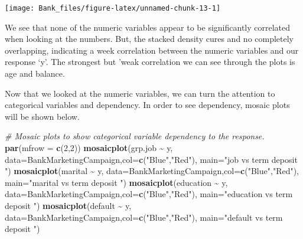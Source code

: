 \documentclass[
]{article}
\newenvironment{Shaded}{\begin{snugshade}}{\end{snugshade}}
\newcommand{\AttributeTok}[1]{\textcolor[rgb]{0.13,0.29,0.53}{#1}}
\newcommand{\CommentTok}[1]{\textcolor[rgb]{0.56,0.35,0.01}{\textit{#1}}}
\newcommand{\DecValTok}[1]{\textcolor[rgb]{0.00,0.00,0.81}{#1}}
\newcommand{\FunctionTok}[1]{\textcolor[rgb]{0.13,0.29,0.53}{\textbf{#1}}}
\newcommand{\NormalTok}[1]{#1}
\newcommand{\SpecialCharTok}[1]{\textcolor[rgb]{0.81,0.36,0.00}{\textbf{#1}}}
\newcommand{\StringTok}[1]{\textcolor[rgb]{0.31,0.60,0.02}{#1}}
\begin{document}
\begin{center}\texttt{[image: Bank\_files/figure-latex/unnamed-chunk-13-1]} \end{center}

We see that none of the numeric variables appear to be significantly
correlated when looking at the numbers. But, the stacked density cures
and no completely overlapping, indicating a week correlation between the
numeric variables and our response `y'. The strongest but 'weak
correlation we can see through the plots is age and balance.

Now that we looked at the numeric variables, we can turn the attention
to categorical variables and dependency. In order to see dependency,
mosaic plots will be shown below.

\begin{Shaded}
\begin{Highlighting}[]
\CommentTok{\# Mosaic plots to show categorical variable dependency to the response.}
\FunctionTok{par}\NormalTok{(}\AttributeTok{mfrow =} \FunctionTok{c}\NormalTok{(}\DecValTok{2}\NormalTok{,}\DecValTok{2}\NormalTok{))}
\FunctionTok{mosaicplot}\NormalTok{(grp.job }\SpecialCharTok{\textasciitilde{}}\NormalTok{ y, }\AttributeTok{data=}\NormalTok{BankMarketingCampaign,}\AttributeTok{col=}\FunctionTok{c}\NormalTok{(}\StringTok{"Blue"}\NormalTok{,}\StringTok{"Red"}\NormalTok{), }\AttributeTok{main=}\StringTok{"job vs term deposit "}\NormalTok{)}
\FunctionTok{mosaicplot}\NormalTok{(marital }\SpecialCharTok{\textasciitilde{}}\NormalTok{ y, }\AttributeTok{data=}\NormalTok{BankMarketingCampaign,}\AttributeTok{col=}\FunctionTok{c}\NormalTok{(}\StringTok{"Blue"}\NormalTok{,}\StringTok{"Red"}\NormalTok{), }\AttributeTok{main=}\StringTok{"marital vs term deposit "}\NormalTok{)}
\FunctionTok{mosaicplot}\NormalTok{(education }\SpecialCharTok{\textasciitilde{}}\NormalTok{ y, }\AttributeTok{data=}\NormalTok{BankMarketingCampaign,}\AttributeTok{col=}\FunctionTok{c}\NormalTok{(}\StringTok{"Blue"}\NormalTok{,}\StringTok{"Red"}\NormalTok{), }\AttributeTok{main=}\StringTok{"education vs term deposit "}\NormalTok{)}
\FunctionTok{mosaicplot}\NormalTok{(default }\SpecialCharTok{\textasciitilde{}}\NormalTok{ y, }\AttributeTok{data=}\NormalTok{BankMarketingCampaign,}\AttributeTok{col=}\FunctionTok{c}\NormalTok{(}\StringTok{"Blue"}\NormalTok{,}\StringTok{"Red"}\NormalTok{), }\AttributeTok{main=}\StringTok{"default vs term deposit "}\NormalTok{)}
\end{Highlighting}
\end{Shaded}
\end{document}
